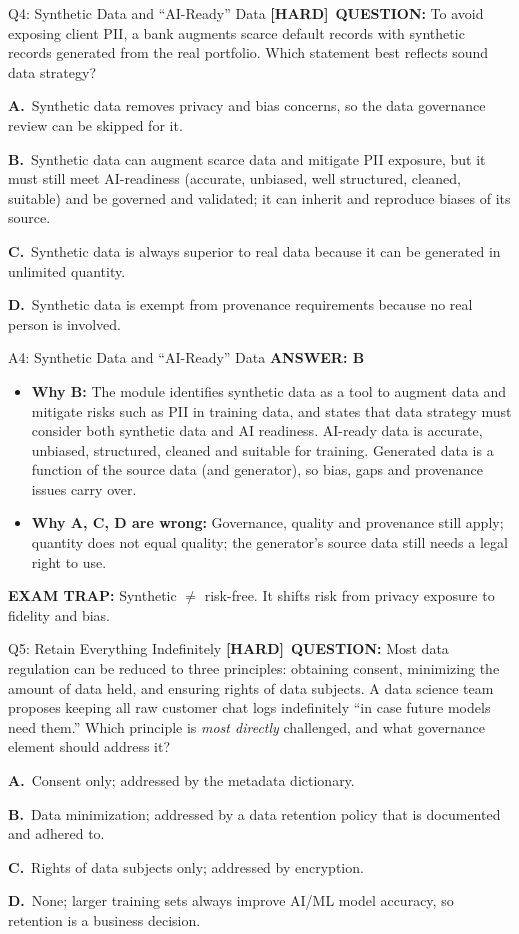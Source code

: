 \documentclass[8pt]{beamer}
\newcommand{\fs}{\fontsize{10}{12}\selectfont}
\newcommand{\opts}[4]{\par\vspace{0.12cm}\noindent\textbf{A.}~#1\par\vspace{0.08cm}\noindent\textbf{B.}~#2\par\vspace{0.08cm}\noindent\textbf{C.}~#3\par\vspace{0.08cm}\noindent\textbf{D.}~#4\par}
\newcommand{\ans}[1]{\textcolor{myblue}{\textbf{ANSWER: #1}}}
\newcommand{\trap}[1]{\textcolor{myred}{\textbf{EXAM TRAP:}} #1}
\newcommand{\hard}{\textcolor{myorange}{\textbf{[HARD]}}}
\begin{document}
\begin{frame}[t]{Q4: Synthetic Data and ``AI-Ready'' Data}
\fs
\hard\ \textbf{QUESTION:} To avoid exposing client PII, a bank augments scarce default records with synthetic records generated from the real portfolio. Which statement best reflects sound data strategy?
\opts{Synthetic data removes privacy and bias concerns, so the data governance review can be skipped for it.}
{Synthetic data can augment scarce data and mitigate PII exposure, but it must still meet AI-readiness (accurate, unbiased, well structured, cleaned, suitable) and be governed and validated; it can inherit and reproduce biases of its source.}
{Synthetic data is always superior to real data because it can be generated in unlimited quantity.}
{Synthetic data is exempt from provenance requirements because no real person is involved.}
\end{frame}

\begin{frame}[t]{A4: Synthetic Data and ``AI-Ready'' Data}
\fs
\ans{B}
\begin{itemize}
\item \textbf{Why B:} The module identifies synthetic data as a tool to augment data and mitigate risks such as PII in training data, and states that data strategy must consider both synthetic data and AI readiness. AI-ready data is accurate, unbiased, structured, cleaned and suitable for training. Generated data is a function of the source data (and generator), so bias, gaps and provenance issues carry over.
\item \textbf{Why A, C, D are wrong:} Governance, quality and provenance still apply; quantity does not equal quality; the generator's source data still needs a legal right to use.
\end{itemize}
\trap{Synthetic $\neq$ risk-free. It shifts risk from \textcolor{myblue}{privacy exposure} to \textcolor{myblue}{fidelity and bias}.}
\end{frame}

\begin{frame}[t]{Q5: Retain Everything Indefinitely}
\fs
\hard\ \textbf{QUESTION:} Most data regulation can be reduced to three principles: obtaining consent, minimizing the amount of data held, and ensuring rights of data subjects. A data science team proposes keeping all raw customer chat logs indefinitely ``in case future models need them.'' Which principle is \emph{most directly} challenged, and what governance element should address it?
\opts{Consent only; addressed by the metadata dictionary.}
{Data minimization; addressed by a data retention policy that is documented and adhered to.}
{Rights of data subjects only; addressed by encryption.}
{None; larger training sets always improve AI/ML model accuracy, so retention is a business decision.}
\end{frame}
\end{document}
